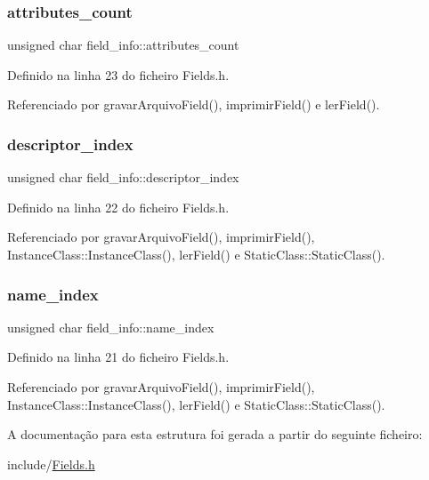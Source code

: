 \subsubsection{\texorpdfstring{attributes\+\_\+count}{attributes\_count}}
{\footnotesize\ttfamily unsigned char field\+\_\+info\+::attributes\+\_\+count}



Definido na linha 23 do ficheiro Fields.\+h.



Referenciado por gravar\+Arquivo\+Field(), imprimir\+Field() e ler\+Field().

\mbox{\label{structfield__info_afe39e4e9e594dfce15635923ad7d1f06}} 
\subsubsection{\texorpdfstring{descriptor\+\_\+index}{descriptor\_index}}
{\footnotesize\ttfamily unsigned char field\+\_\+info\+::descriptor\+\_\+index}



Definido na linha 22 do ficheiro Fields.\+h.



Referenciado por gravar\+Arquivo\+Field(), imprimir\+Field(), Instance\+Class\+::\+Instance\+Class(), ler\+Field() e Static\+Class\+::\+Static\+Class().

\mbox{\label{structfield__info_abb3389c726c0efe891c2d26567ecea49}} 
\subsubsection{\texorpdfstring{name\+\_\+index}{name\_index}}
{\footnotesize\ttfamily unsigned char field\+\_\+info\+::name\+\_\+index}



Definido na linha 21 do ficheiro Fields.\+h.



Referenciado por gravar\+Arquivo\+Field(), imprimir\+Field(), Instance\+Class\+::\+Instance\+Class(), ler\+Field() e Static\+Class\+::\+Static\+Class().



A documentação para esta estrutura foi gerada a partir do seguinte ficheiro\+:\begin{DoxyCompactItemize}
\item 
include/\hyperlink{Fields_8h}{Fields.\+h}\end{DoxyCompactItemize}
